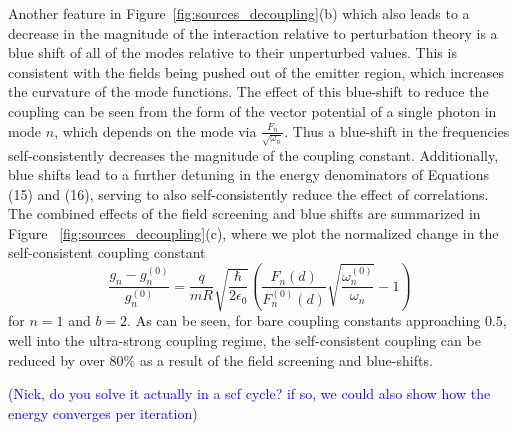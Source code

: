 \documentclass[aps,prb,twocolumn,
	groupedaddress,superscriptaddress,
	amsfonts,amssymb,amsmath,floatfix,
	citeautoscript]{revtex4-1}
\newcommand{\Jadd}[1]{\textcolor{blue}{#1}}
\begin{document}
Another feature in Figure~\ref{fig:sources_decoupling}(b) which also leads to a decrease in the magnitude of the interaction relative to perturbation theory is a blue shift of all of the modes relative to their unperturbed values. This is consistent with the fields being pushed out of the emitter region, which increases the curvature of the mode functions. The effect of this blue-shift to reduce the coupling can be seen from the form of the vector potential of a single photon in mode $n$, which depends on the mode via $\frac{F_n}{\sqrt{\omega_n}}$. Thus a blue-shift in the frequencies self-consistently decreases the magnitude of the coupling constant. Additionally, blue shifts lead to a further detuning in the energy denominators of Equations (15) and (16), serving to also self-consistently reduce the effect of correlations. The combined effects of the field screening and blue shifts are summarized in Figure ~\ref{fig:sources_decoupling}(c), where we plot the normalized change in the self-consistent coupling constant 
\begin{equation}
\frac{g_n-g_n^{(0)}}{g_n^{(0)}} = \frac{q}{mR}\sqrt{\frac{\hbar}{2\epsilon_0}}\left(\frac{F_n(d)}{F^{(0)}_n(d)}\sqrt{\frac{\omega^{(0)}_n}{\omega_n}}-1\right)
\end{equation}
for $n=1$ and $b=2$. As can be seen, for bare coupling constants approaching $0.5$, well into the ultra-strong coupling regime, the self-consistent coupling can be reduced by over 80\% as a result of the field screening and blue-shifts.

\Jadd{(Nick, do you solve it actually in a scf cycle? if so, we could also show how the energy converges per iteration)}
\end{document}
